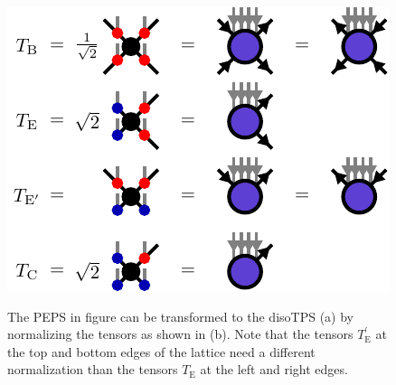 \begin{figure}
	\centering
	\subcaptionbox{\label{fig:toric_code_disoTPS_representation}}
	{%
		\usebox{\largestimage}
	}
	\quad\quad\quad
	\subcaptionbox{\label{fig:toric_code_disoTPS_representation_tensor_definitions}}
	{%
		\raisebox{\dimexpr.5\ht\largestimage-.5\height}
		{%
			\includegraphics[scale=1]{figures/tikz/toric_code/disoTPS_representation/disoTPS_representation_b.pdf}
		}
	}
	\caption{The PEPS in figure \protect{} can be transformed to the disoTPS (a) by normalizing the tensors as shown in (b). Note that the tensors $T_\text{E}^\prime$ at the top and bottom edges of the lattice need a different normalization than the tensors $T_\text{E}$ at the left and right edges.}
	\label{fig:toric_code_disoTPS}
\end{figure}
